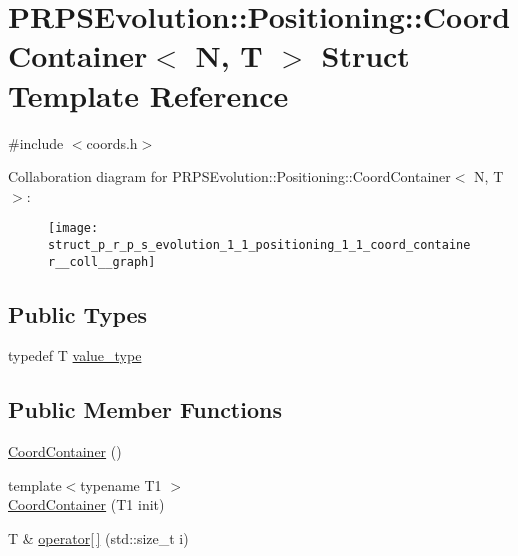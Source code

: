 \hypertarget{struct_p_r_p_s_evolution_1_1_positioning_1_1_coord_container}{\section{\-P\-R\-P\-S\-Evolution\-:\-:\-Positioning\-:\-:\-Coord\-Container$<$ \-N, \-T $>$ \-Struct \-Template \-Reference}
\label{struct_p_r_p_s_evolution_1_1_positioning_1_1_coord_container}
}


{\ttfamily \#include $<$coords.\-h$>$}



\-Collaboration diagram for \-P\-R\-P\-S\-Evolution\-:\-:\-Positioning\-:\-:\-Coord\-Container$<$ \-N, \-T $>$\-:
\nopagebreak
\begin{figure}[H]
\begin{center}
\leavevmode
\texttt{[image: struct\_p\_r\_p\_s\_evolution\_1\_1\_positioning\_1\_1\_coord\_container\_\_coll\_\_graph]}
\end{center}
\end{figure}
\subsection*{\-Public \-Types}
\begin{DoxyCompactItemize}
\item 
typedef \-T \hyperlink{struct_p_r_p_s_evolution_1_1_positioning_1_1_coord_container_aa81c47e8743b6045ffd3ac7f681a3172}{value\-\_\-type}
\end{DoxyCompactItemize}
\subsection*{\-Public \-Member \-Functions}
\begin{DoxyCompactItemize}
\item 
\hyperlink{struct_p_r_p_s_evolution_1_1_positioning_1_1_coord_container_a4375b7bd499238f0ec84efbfbe7572eb}{\-Coord\-Container} ()
\item 
{\footnotesize template$<$typename T1 $>$ }\\\hyperlink{struct_p_r_p_s_evolution_1_1_positioning_1_1_coord_container_afe883d4d3bfbe0ae5672ed6470d07f5d}{\-Coord\-Container} (\-T1 init)
\item 
\-T \& \hyperlink{struct_p_r_p_s_evolution_1_1_positioning_1_1_coord_container_a368a953b0794092caf3f30bef0e6b663}{operator\mbox{[}$\,$\mbox{]}} (std\-::size\-\_\-t i)
\end{DoxyCompactItemize}
